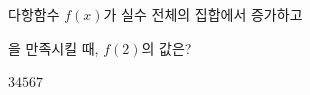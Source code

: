 다항함수 $f(x)$가 실수 전체의 집합에서 증가하고 \par\smallskip{}\par\smallskip\noindent 을 만족시킬 때, $f(2)$의 값은?
\begin{choices32}{$3$}{$4$}{$5$}{$6$}{$7$}\end{choices32}
